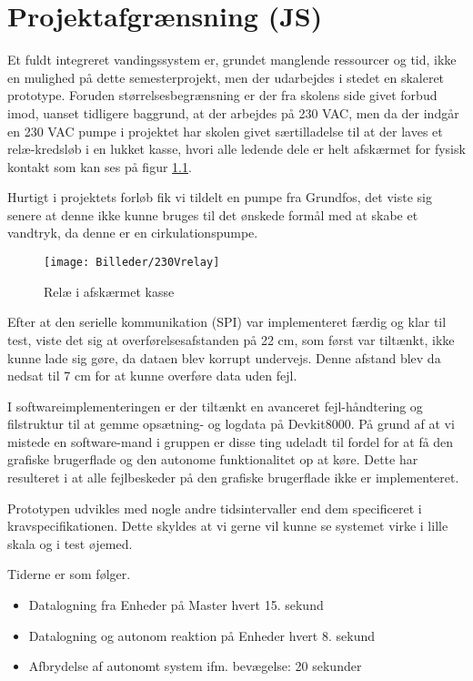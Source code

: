 \chapter{Projektafgrænsning (JS)}

Et fuldt integreret vandingssystem er, grundet manglende ressourcer og tid, ikke en mulighed på dette semesterprojekt, men der udarbejdes i stedet en skaleret prototype.
Foruden størrelsesbegrænsning er der fra skolens side givet forbud imod, uanset tidligere baggrund, at der arbejdes på 230 VAC, men da der indgår en 230 VAC pumpe i projektet har skolen givet særtilladelse til at der laves et relæ-kredsløb i en lukket kasse, hvori alle ledende dele er helt afskærmet for fysisk kontakt som kan ses på figur \ref{lab:230Vrelay}.

Hurtigt i projektets forløb fik vi tildelt en pumpe fra Grundfos, det viste sig senere at denne ikke kunne bruges til det ønskede formål med at skabe et vandtryk, da denne er en cirkulationspumpe. 


\begin{figure}[H]
  \centering
    \texttt{[image: Billeder/230Vrelay]}
    \caption{Relæ i afskærmet kasse}
    \label{lab:230Vrelay}
\end{figure}

Efter at den serielle kommunikation (SPI) var implementeret færdig og klar til test, viste det sig at overførelsesafstanden på 22 cm, som først var tiltænkt, ikke kunne lade sig gøre, da dataen blev korrupt undervejs. Denne afstand blev da nedsat til 7 cm for at kunne overføre data uden fejl.
 
I softwareimplementeringen er der tiltænkt en  avanceret fejl-håndtering og filstruktur til at gemme opsætning- og logdata på Devkit8000. På grund af at vi mistede en software-mand i gruppen er disse ting udeladt til fordel for at få den grafiske brugerflade og den autonome funktionalitet op at køre. Dette har resulteret i at alle fejlbeskeder på den grafiske brugerflade ikke er implementeret.

Prototypen udvikles med nogle andre tidsintervaller end dem specificeret i kravspecifikationen. Dette skyldes at vi gerne vil kunne se systemet virke i lille skala og i test øjemed.

Tiderne er som følger.

\begin{itemize}
	\item Datalogning fra Enheder på Master hvert 15. sekund
	\item Datalogning og autonom reaktion på Enheder hvert 8. sekund
	\item Afbrydelse af autonomt system ifm. bevægelse: 20 sekunder
\end{itemize}